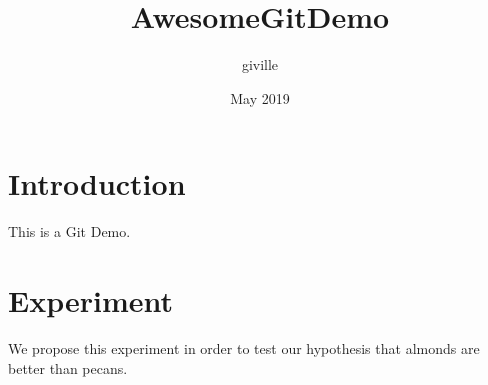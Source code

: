 \documentclass{article}
\title{AwesomeGitDemo}
\author{giville }
\date{May 2019}
\begin{document}
\maketitle

\section{Introduction}


This is a Git Demo.



\section{Experiment}

We propose this experiment in order to test our hypothesis that almonds are better than pecans.
\end{document}
